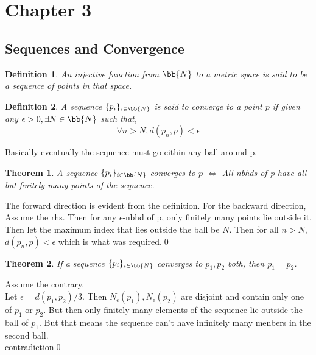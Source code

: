 \documentclass{myclass}
\newtheorem*{definition}{Definition}
\newtheorem*{theorem}{Theorem}
\begin{document}
\section*{Chapter 3}

\subsection{Sequences and Convergence}

\begin{definition}
    An injective function from $\bb{N}$ to a metric space is said to be a 
    sequence of points in that space.
\end{definition}

\begin{definition}
    A sequence $\{p_i\}_{i\in\bb{N}}$ is said to converge to a point $p$ if given any
    $\epsilon>0,\exists N\in\bb{N}$ such that,$$\forall n>N, d(p_n,p)<\epsilon$$
\end{definition}

\begin{remark}
    Basically eventually the sequence must go eithin any ball around p.
\end{remark}

\begin{theorem}
    A sequence $\{p_i\}_{i\in\bb{N}}$ converges to $p$ $\iff$ All nbhds of p have all but finitely many points of the sequence.
\end{theorem}
\begin{prf}
    The forward direction is evident from the definition. For the backward direction, Assume the rhs.
    Then for any $\epsilon$-nbhd of p, only finitely many points lie outside it. Then let the maximum index that lies outside the ball be $N$.
    Then for all $n>N$,$d(p_n,p)<\epsilon$ which is what was required.\qed
\end{prf}

\begin{theorem}
    If a sequence $\{p_i\}_{i\in\bb{N}}$ converges to $p_1,p_2$ both, then $p_1=p_2$.
\end{theorem}
\begin{prf}
    Assume the contrary.\\
    Let $\epsilon=d(p_1,p_2)/3$. Then $N_\epsilon(p_1),N_\epsilon(p_2)$ are disjoint and contain only one of $p_1$ or $p_2$.
    But then only finitely many elements of the sequence lie outside the ball of $p_1$. But that means the sequence can't have infinitely many menbers in the second ball.\\
    contradiction\qed
\end{prf}
\end{document}
